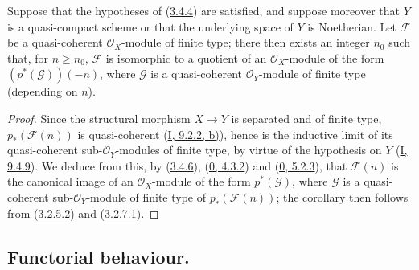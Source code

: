 \begin{corollary}[3.4.8]
\label{II.3.4.8}
Suppose that the hypotheses of (\hyperref[II.3.4.4]{3.4.4}) are satisfied,
and suppose moreover that $Y$ is a quasi-compact scheme or that the
underlying space of $Y$ is Noetherian. Let $\mathcal{F}$ be a
quasi-coherent $\mathcal{O}_X$-module of finite type; there then exists an
integer $n_0$ such that, for $n\geq n_0$, $\mathcal{F}$ is isomorphic to a
quotient of an $\mathcal{O}_X$-module of the form $(p^*(\mathcal{G}))(-n)$,
where $\mathcal{G}$ is a quasi-coherent $\mathcal{O}_Y$-module of finite type
(depending on $n$).
\end{corollary}

\begin{proof}
Since the structural morphism $X\to Y$ is separated and of finite type,
$p_*(\mathcal{F}(n))$ is quasi-coherent
(\hyperref[I.9.2.2]{I, 9.2.2, b)}), hence is the inductive limit of its
quasi-coherent sub-$\mathcal{O}_Y$-modules of finite type, by virtue of
the hypothesis on $Y$ (\hyperref[I.9.4.9]{I, 9.4.9}). We deduce from this,
by (\hyperref[II.3.4.6]{3.4.6}),
(\hyperref[0.4.3.2]{0, 4.3.2}) and
(\hyperref[0.5.2.3]{0, 5.2.3}), that $\mathcal{F}(n)$ is the canonical
image of an $\mathcal{O}_X$-module of the form $p^*(\mathcal{G})$, where
$\mathcal{G}$ is a quasi-coherent sub-$\mathcal{O}_Y$-module of finite type of
$p_*(\mathcal{F}(n))$; the corollary then follows from
(\hyperref[II.3.2.5.2]{3.2.5.2}) and
(\hyperref[II.3.2.7.1]{3.2.7.1}).
\end{proof}

\subsection{Functorial behaviour.}
\label{subsection:II.3.5}


